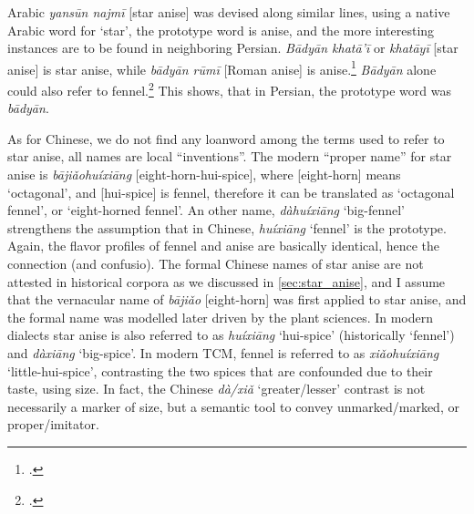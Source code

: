 Arabic \textit{yansūn najmī} [star anise] was devised along similar lines, using a native Arabic word for `star', the prototype word is anise, and the more interesting instances are to be found in neighboring Persian. \textit{Bādyān khatā'ī} or \textit{khatāyī} [star anise] is star anise, while \textit{bādyān rūmī} [Roman anise] is anise.\footcite[vol. 1, p. 197]{hayyim_new_1934} \textit{Bādyān} alone could also refer to fennel.\footcite[140]{steingass_comprehensive_1892} This shows, that in Persian, the prototype word was \textit{bādyān}. 

As for Chinese, we do not find any loanword among the terms used to refer to star anise, all names are local ``inventions''. The modern ``proper name'' for star anise is \textit{bājiǎohuíxiāng} [eight-horn-hui-spice], where [eight-horn] means `octagonal', and [hui-spice] is fennel, therefore it can be translated as `octagonal fennel', or `eight-horned fennel'. An other name, \textit{dàhuíxiāng} `big-fennel' strengthens the assumption that in Chinese, \textit{huíxiāng} `fennel' is the prototype. Again, the flavor profiles of fennel and anise are basically identical, hence the connection (and confusio). The formal Chinese names of star anise are not attested in historical corpora as we discussed in \cref{sec:star_anise}, and I assume that the vernacular name of \textit{bājiǎo} [eight-horn] was first applied to star anise, and the formal name was modelled later driven by the plant sciences. In modern dialects star anise is also referred to as \textit{huíxiāng} `hui-spice' (historically `fennel') and \textit{dàxiāng} `big-spice'. In modern \gls{TCM}, fennel is referred to as \textit{xiǎohuíxiāng} `little-hui-spice', contrasting the two spices that are confounded due to their taste, using size. In fact, the Chinese  \textit{dà/xiǎ} `greater/lesser' contrast is not necessarily a marker of size, but a semantic tool to convey unmarked/marked, or proper/imitator.



